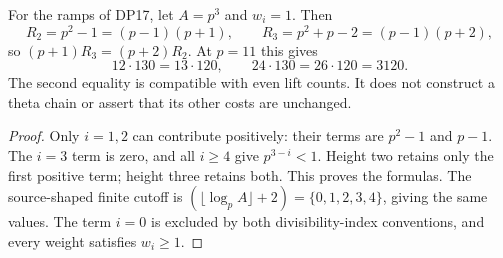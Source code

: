 \begin{proposition}\label{DP26}
For the ramps of DP17, let $A=p^3$ and $w_i=1$. Then
\[
 R_2=p^2-1=(p-1)(p+1),\qquad
 R_3=p^2+p-2=(p-1)(p+2),
\]
so $(p+1)R_3=(p+2)R_2$. At $p=11$ this gives
\[
 12\cdot130=13\cdot120,
 \qquad 24\cdot130=26\cdot120=3120.
\]
The second equality is compatible with even lift counts. It does not construct a theta chain or assert that its other costs are unchanged.
\end{proposition}
\begin{proof}
Only $i=1,2$ can contribute positively: their terms are $p^2-1$ and $p-1$. The $i=3$ term is zero, and all $i\ge4$ give $p^{3-i}<1$. Height two retains only the first positive term; height three retains both. This proves the formulas. The source-shaped finite cutoff is $(\lfloor\log_p A\rfloor+2)=\{0,1,2,3,4\}$, giving the same values. The term $i=0$ is excluded by both divisibility-index conventions, and every weight satisfies $w_i\ge1$.
\end{proof}
